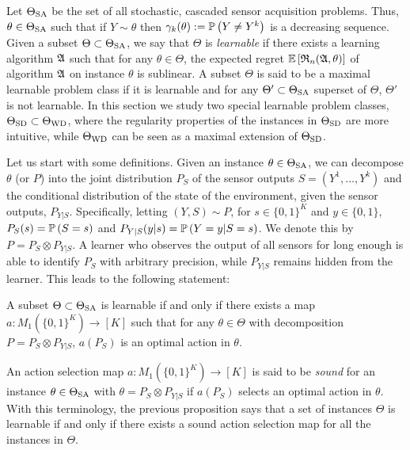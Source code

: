 \vspace{-7pt}
Let $\Theta_{\mathrm{SA}}$ be the set of all stochastic, cascaded sensor acquisition problems. 
Thus, $\theta \in \Theta_{\mathrm{SA}}$ such that if $Y\sim \theta$ then $\gamma_k(\theta):=\mathbb{P}\left(Y\ne Y^k\right)$ 
is a decreasing sequence.
Given a subset $\Theta\subset \Theta_{\mathrm{SA}}$, we say that $\Theta$ is \emph{learnable} 
if there exists a learning algorithm $\mathfrak{A}$ such that
for any $\theta\in \Theta$, the expected regret $\mathbb{E}\left[ \mathfrak{R}_n(\mathfrak{A},\theta) \right]$ 
of algorithm $\mathfrak{A}$ on instance $\theta$ is sublinear.
A subset $\Theta$ is said to be a maximal learnable problem class if it is learnable and for any $\Theta'\subset \Theta_{\mathrm{SA}}$ superset
of $\Theta$, $\Theta'$ is not learnable.
In this section we study two special learnable problem classes, $\Theta_{\mathrm{SD}}\subset \Theta_{\mathrm{WD}}$, where the regularity properties of the instances in $\Theta_{\mathrm{SD}}$ are more intuitive, while $\Theta_{\mathrm{WD}}$ can be seen as a maximal extension of $\Theta_{\mathrm{SD}}$.

Let us start with some definitions.
Given an instance $\theta \in \Theta_{\mathrm{SA}}$, we can decompose $\theta$ (or $P$) into the joint distribution $P_S$ of the sensor outputs $S = (Y^1,\dots,Y^k)$ and the conditional distribution of the state of the environment, given the sensor outputs, $P_{Y|S}$.
Specifically, letting $(Y,S)\sim P$, for $s\in \{0,1\}^K$ and $y\in \{0,1\}$, $P_S(s) = \mathbb{P}\left(S = s\right)$ and $P_{Y|S}(y|s) = \mathbb{P}\left(Y=y|S=s\right)$. We denote this by $P = P_S \otimes P_{Y|S}$.
A learner who observes the output of all sensors for long enough is able to identify 
$P_S$ with arbitrary precision, while $P_{Y|S}$ remains hidden from the learner.
 This leads to the following statement:
\begin{prop}
\label{prop:learnablemap}
A subset $\Theta\subset \Theta_{\mathrm{SA}}$ is learnable 
if and only if there exists a map $a: M_1( \{0,1\}^K )\to [K]$ such that 
for any $\theta \in \Theta$ 
with decomposition $P = P_S \otimes P_{Y|S}$, $a(P_S)$ is an optimal action in $\theta$.
\end{prop}


An action selection map  $a: M_1( \{0,1\}^K ) \to [K]$ is said to be \emph{sound} for an instance 
$\theta\in \Theta_{\mathrm{SA}}$ with $\theta = P_S\otimes P_{Y|S}$ if $a(P_S)$ selects an optimal action in $\theta$.
With this terminology, the previous proposition says that a set of instances $\Theta$ is learnable if and only if there exists a
sound action selection map for all the instances in $\Theta$.

